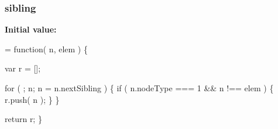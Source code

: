 \subsubsection[{sibling}]{ sibling}\label{jquery-1_810_82-vsdoc_8js_aab3156d09bb394a1adc703b3daa9a6e5}
{\bfseries Initial value\+:}
\begin{DoxyCode}
= \textcolor{keyword}{function}( n, elem ) \{

        var r = [];

        \textcolor{keywordflow}{for} ( ; n; n = n.nextSibling ) \{
            \textcolor{keywordflow}{if} ( n.nodeType === 1 && n !== elem ) \{
                r.push( n );
            \}
        \}

        \textcolor{keywordflow}{return} r;
    \}
\end{DoxyCode}
\hypertarget{jquery-1_810_82-vsdoc_8js_a0e6e8c52ac2dbde17cbca14513a6a388}{}
